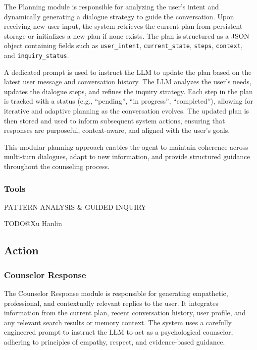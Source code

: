 The Planning module is responsible for analyzing the user's intent and dynamically generating a dialogue strategy to guide the conversation. Upon receiving new user input, the system retrieves the current plan from persistent storage or initializes a new plan if none exists. The plan is structured as a JSON object containing fields such as \texttt{user\_intent}, \texttt{current\_state}, \texttt{steps}, \texttt{context}, and \texttt{inquiry\_status}. 

A dedicated prompt is used to instruct the LLM to update the plan based on the latest user message and conversation history. The LLM analyzes the user's needs, updates the dialogue steps, and refines the inquiry strategy. Each step in the plan is tracked with a status (e.g., ``pending'', ``in progress'', ``completed''), allowing for iterative and adaptive planning as the conversation evolves. The updated plan is then stored and used to inform subsequent system actions, ensuring that responses are purposeful, context-aware, and aligned with the user's goals.

This modular planning approach enables the agent to maintain coherence across multi-turn dialogues, adapt to new information, and provide structured guidance throughout the counseling process.

\subsubsection{Tools}

PATTERN ANALYSIS \& GUIDED INQUIRY

TODO@Xu Hanlin

\subsection{Action}

\subsubsection{Counselor Response}

The Counselor Response module is responsible for generating empathetic, professional, and contextually relevant replies to the user. It integrates information from the current plan, recent conversation history, user profile, and any relevant search results or memory context. The system uses a carefully engineered prompt to instruct the LLM to act as a psychological counselor, adhering to principles of empathy, respect, and evidence-based guidance.

